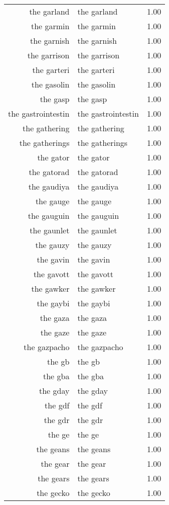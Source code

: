 \begin{table}[ht]
\begin{tabular}{rlr}
  the garland & the garland & 1.00 \\ 
  the garmin & the garmin & 1.00 \\ 
  the garnish & the garnish & 1.00 \\ 
  the garrison & the garrison & 1.00 \\ 
  the garteri & the garteri & 1.00 \\ 
  the gasolin & the gasolin & 1.00 \\ 
  the gasp & the gasp & 1.00 \\ 
  the gastrointestin & the gastrointestin & 1.00 \\ 
  the gathering & the gathering & 1.00 \\ 
  the gatherings & the gatherings & 1.00 \\ 
  the gator & the gator & 1.00 \\ 
  the gatorad & the gatorad & 1.00 \\ 
  the gaudiya & the gaudiya & 1.00 \\ 
  the gauge & the gauge & 1.00 \\ 
  the gauguin & the gauguin & 1.00 \\ 
  the gaunlet & the gaunlet & 1.00 \\ 
  the gauzy & the gauzy & 1.00 \\ 
  the gavin & the gavin & 1.00 \\ 
  the gavott & the gavott & 1.00 \\ 
  the gawker & the gawker & 1.00 \\ 
  the gaybi & the gaybi & 1.00 \\ 
  the gaza & the gaza & 1.00 \\ 
  the gaze & the gaze & 1.00 \\ 
  the gazpacho & the gazpacho & 1.00 \\ 
  the gb & the gb & 1.00 \\ 
  the gba & the gba & 1.00 \\ 
  the gday & the gday & 1.00 \\ 
  the gdf & the gdf & 1.00 \\ 
  the gdr & the gdr & 1.00 \\ 
  the ge & the ge & 1.00 \\ 
  the geans & the geans & 1.00 \\ 
  the gear & the gear & 1.00 \\ 
  the gears & the gears & 1.00 \\ 
  the gecko & the gecko & 1.00 \\ 

\end{tabular}
\end{table}

